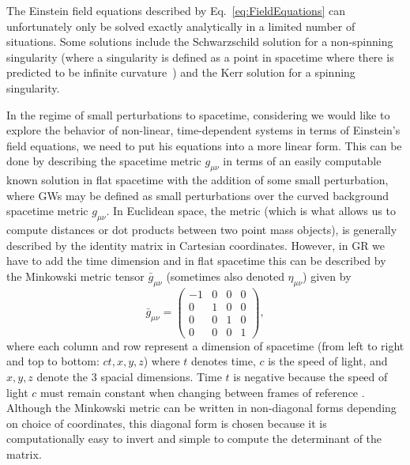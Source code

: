 %
%
The Einstein field equations described by Eq.~\ref{eq:FieldEquations} can  unfortunately only be solved exactly analytically in a limited number of situations. Some solutions include the Schwarzschild solution for a non-spinning singularity (where a singularity is defined as a point in spacetime where 
there is predicted to be infinite curvature~\cite{carroll_2019}) and the Kerr solution for a spinning singularity. 

In the regime of small perturbations 
to spacetime, considering we would like to explore the behavior of non-linear, time-dependent systems in terms of Einstein's field equations, 
we need to put his equations into a more linear form. This can be done by describing the spacetime metric $g_{\mu\nu}$ in terms of an easily computable known solution in flat spacetime with the addition of some small perturbation,
%
%
where \ac{GW}s may be defined as small perturbations over the curved background spacetime metric $g_{\mu \nu}$. In Euclidean space, the metric (which is what allows us to compute distances or dot products between two point mass objects), is generally described by the identity matrix in Cartesian coordinates. However, in \ac{GR} we have to add the time dimension and in flat spacetime this can be described by the Minkowski metric tensor $\bar{g}_{\mu \nu}$ (sometimes also denoted $\eta_{\mu \nu}$) given by 
%
\begin{equation}
  \bar{g}_{\mu \nu} =   \begin{pmatrix}
-1 & 0 & 0 & 0\\
0 & 1 & 0 & 0\\
0 & 0 & 1 & 0\\
0 & 0 & 0 & 1
\end{pmatrix},
\end{equation}
%
where each column and row represent a dimension of spacetime 
(from left to right and top to bottom: $ct,x,y,z$) where $t$ denotes time, $c$ is the speed of light, 
and $x,y,z$ denote the 
3 spacial dimensions. Time $t$ is negative because the speed 
of light $c$ must remain constant when changing between frames of 
reference \cite{carroll_2019} . 
Although the Minkowski metric can be written in non-diagonal 
forms depending on choice of coordinates, this diagonal form 
is chosen because it is computationally easy to invert 
and simple to compute the determinant of the matrix.

